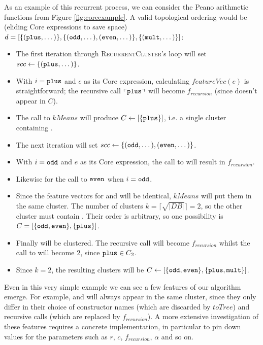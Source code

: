 As an example of this recurrent process, we can consider the Peano arithmetic functions from Figure \ref{fig:coreexample}. A valid topological ordering would be (eliding Core expressions to save space) $d = [\{(\texttt{plus}, \dots)\}, \{(\texttt{odd}, \dots), (\texttt{even}, \dots)\}, \{(\texttt{mult}, \dots)\}]$:

\begin{itemize}
  \item The first iteration through \textsc{RecurrentCluster}'s loop will set $scc \gets \{(\texttt{plus}, \dots)\}$.
  \item With $i = \texttt{plus}$ and $e$ as its Core expression, calculating $featureVec(e)$ is straightforward; the recursive call $\left\ulcorner \texttt{plus} \right\urcorner$ will become $f_{recursion}$ (since  doesn't appear in $C$).
  \item The call to $kMeans$ will produce $C \gets [\{\texttt{plus}\}]$, i.e. a single cluster containing .
  \item The next iteration will set $scc \gets \{(\texttt{odd}, \dots), (\texttt{even}, \dots)\}$.
  \item With $i = \texttt{odd}$ and $e$ as its Core expression, the call to  will result in $f_{recursion}$.
  \item Likewise for the call to $\texttt{even}$ when $i = \texttt{odd}$.
  \item Since the feature vectors for  and  will be identical, $kMeans$ will put them in the same cluster. The number of clusters $k = \lceil \sqrt{\lvert DB \rvert} \rceil = 2$, so the other cluster must contain . Their order is arbitrary, so one possibility is $C = [\{\texttt{odd}, \texttt{even}\}, \{\texttt{plus}\}]$.
  \item Finally  will be clustered. The recursive call will become $f_{recursion}$ whilst the call to  will become $2$, since $\texttt{plus} \in C_2$.
  \item Since $k = 2$, the resulting clusters will be $C \gets [\{\texttt{odd}, \texttt{even}\}, \{\texttt{plus}, \texttt{mult}\}]$.
\end{itemize}

Even in this very simple example we can see a few features of our algorithm emerge. For example,  and  will always appear in the same cluster, since they only differ in their choice of constructor names (which are discarded by $toTree$) and recursive calls (which are replaced by $f_{recursion}$). A more extensive investigation of these features requires a concrete implementation, in particular to pin down values for the parameters such as $r$, $c$, $f_{recursion}$, $\alpha$ and so on.

